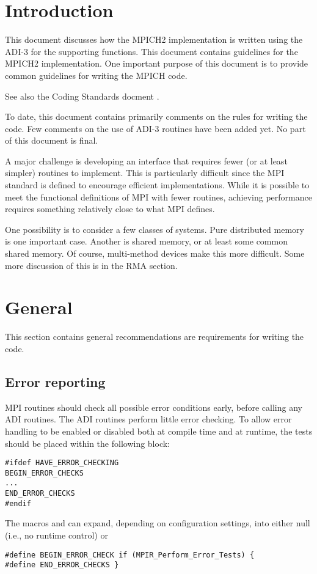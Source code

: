 \documentclass{article}
\begin{document}
\pagestyle{headings}

\section{Introduction}
This document discusses how the MPICH2 implementation is written using
the ADI-3 \cite{adi3man} for the supporting functions.  This document
contains guidelines for the MPICH2 implementation.  One important
purpose of this document is to provide common guidelines for writing
the MPICH code.

See also the Coding Standards docment \cite{coding-standards}.

To date, this document contains primarily comments on the rules for
writing the code.  Few comments on the use of ADI-3 routines have been
added yet.  No part of this document is final.

A major challenge is developing an interface that requires fewer (or
at least simpler) routines to implement.  This is particularly
difficult since the MPI standard is defined to encourage efficient
implementations.  While it is possible to meet the functional
definitions of MPI with fewer routines, achieving performance requires
something relatively close to what MPI defines.

One possibility is to consider a few classes of systems.  Pure
distributed memory is one important case.  Another is shared memory,
or at least some common shared memory.  Of course, multi-method
devices make this more difficult.  Some more discussion of this is in
the RMA section.

\section{General}
This section contains general recommendations are requirements for
writing the code.

\subsection{Error reporting}

MPI routines should check all possible error conditions early, before
calling any ADI routines.  The ADI routines perform little error
checking.  To allow error handling to be enabled or disabled both at compile
time 
and at runtime, the tests should be placed within the following block:
\begin{verbatim}
#ifdef HAVE_ERROR_CHECKING
BEGIN_ERROR_CHECKS
...
END_ERROR_CHECKS
#endif
\end{verbatim}
The macros  and  can
expand, depending on configuration settings, into either null (i.e.,
no runtime control) or 
\begin{verbatim}
#define BEGIN_ERROR_CHECK if (MPIR_Perform_Error_Tests) {
#define END_ERROR_CHECKS }
\end{verbatim}
\end{document}
